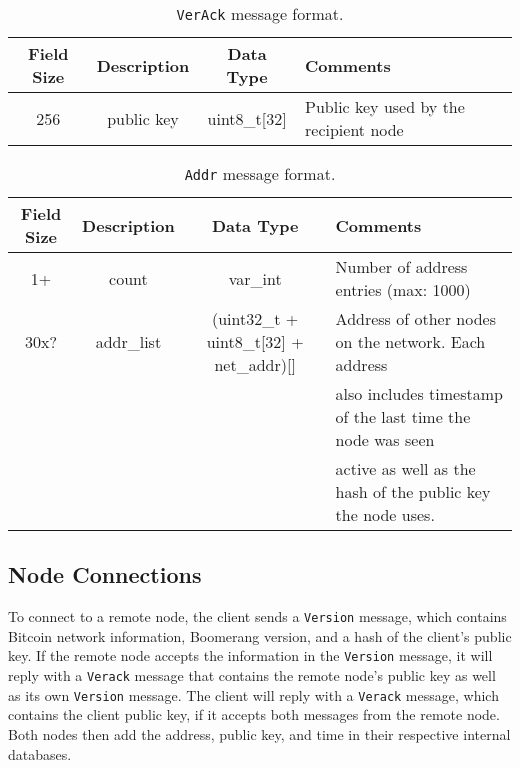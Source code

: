 \begin{table*}[ht!]
\begin{center}
\caption{{\tt VerAck} message format.}
\label{tab:msg-verack}
    \begin{tabular}{|c|c|c|l|} \hline
    \textbf{Field Size} & {\bf Description} & {\bf Data Type} & {\bf Comments} \\ \hline
    256 & public key & uint8\_t[32] & Public key used by the recipient node \\ \hline
    \end{tabular}
\end{center}
\end{table*}

\begin{table*}[ht!]
\begin{center}
\caption{{\tt Addr} message format.}
\label{tab:msg-addr}
    \begin{tabular}{|c|c|c|l|} \hline
    \textbf{Field Size} & {\bf Description} & {\bf Data Type} & {\bf Comments} \\ \hline
    1+ & count & var\_int & Number of address entries (max: 1000) \\
    30x? & addr\_list & (uint32\_t + uint8\_t[32] + net\_addr)[] & Address of other nodes on the network. Each address \\
    ~ & ~ & ~ & also includes timestamp of the last time the node was seen \\
    ~ & ~ & ~ & active as well as the hash of the public key the node uses. \\ \hline
    \end{tabular} 
\end{center}
\end{table*}

\subsection{Node Connections}
To connect to a remote node, the client sends a {\tt Version} message, which contains Bitcoin network information, Boomerang version, and a hash of the client's public key. If the remote node accepts the information in the {\tt Version} message, it will reply with a {\tt Verack} message that contains the remote node's public key as well as its own {\tt Version} message.  The client will reply with a {\tt Verack} message, which contains the client public key, if it accepts both messages from the remote node.  Both nodes then add the address, public key, and time in their respective internal databases.

